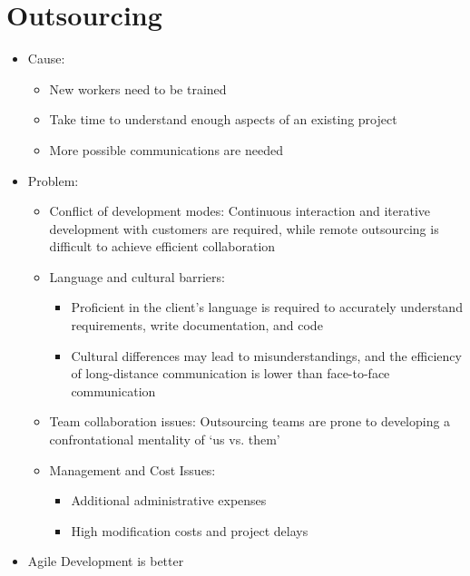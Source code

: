 \documentclass[12pt,openany]{book}
\begin{document}
\section{Outsourcing}
\begin{itemize}
    \item Cause:
    \begin{itemize}
        \item New workers need to be trained
        \item Take time to understand enough aspects of an existing project
        \item More possible communications are needed
    \end{itemize}
    \item Problem:
    \begin{itemize}
        \item Conflict of development modes: Continuous interaction and iterative development with customers are required, while remote outsourcing is difficult to achieve efficient collaboration
        \item Language and cultural barriers:
        \begin{itemize}
            \item Proficient in the client's language is required to accurately understand requirements, write documentation, and code
            \item Cultural differences may lead to misunderstandings, and the efficiency of long-distance communication is lower than face-to-face communication
        \end{itemize}
        \item Team collaboration issues: Outsourcing teams are prone to developing a confrontational mentality of `us vs. them'
        \item Management and Cost Issues:
        \begin{itemize}
            \item Additional administrative expenses
            \item High modification costs and project delays
        \end{itemize}
    \end{itemize}
    \item Agile Development is better
\end{itemize}
\end{document}
